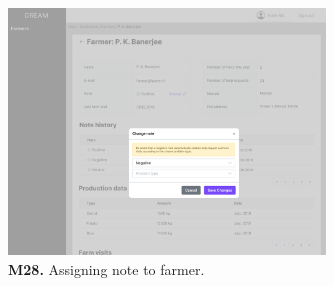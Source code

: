 \begin{figure}[H]
    \centering
    \includegraphics[width=0.75\textwidth]{mockups/Policy maker_Dashboard_Farmers_Farmer_Note_1.png}
    \caption{\textbf{M28.} Assigning note to farmer.}
\end{figure}
